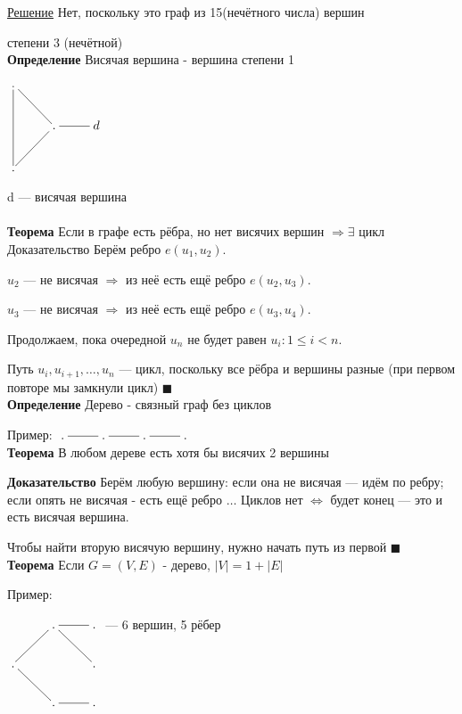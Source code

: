 \documentclass[a4paper, 12pt] {article}
\begin{document}
\underline{Решение} Нет, поскольку это граф из 15(нечётного числа) вершин 

степени 3 (нечётной)\\

\textbf{Определение}
Висячая вершина - вершина степени 1

$\xymatrix{
	. \ar@{-}[dd] \\
	& . \ar@{-}[ul] \ar@{-}[dl] & d \ar@{-}[l]\\
	.\\
}$ 

d --- висячая вершина\\ \\
\textbf{Теорема}
Если в графе есть рёбра, но нет висячих вершин $ \Rightarrow \exists $ цикл
Доказательство
Берём ребро $ e(u_{1}, u_{2}) $. 

$u_{2} $ --- не висячая $ \Rightarrow $ из неё есть ещё ребро $ e(u_{2}, u_{3})$.

$u_{3} $ --- не висячая $ \Rightarrow $ из неё есть ещё ребро $ e(u_{3}, u_{4})$.

Продолжаем, пока очередной $u_{n} $ не будет равен $u_{i}: 1 \le i < n $.

Путь $ u_{i}, u_{i+1}, \dots, u_{n} $ --- цикл, поскольку все рёбра и вершины разные (при первом повторе мы замкнули цикл) $ \blacksquare $\\

\textbf{Определение}
Дерево - связный граф без циклов

Пример:
$\xymatrix{
	. \ar@{-}[r] & . \ar@{-}[r] & . \ar@{-}[r] & . 
} $\\

\textbf{Теорема}
В любом дереве есть хотя бы висячих 2 вершины

\textbf{Доказательство}
Берём любую вершину: если она не висячая --- идём по ребру; если опять не висячая - есть ещё ребро $ \dots $ Циклов нет $ \Leftrightarrow $ будет конец --- это и есть висячая вершина.

Чтобы найти вторую висячую вершину, нужно начать путь из первой $ \blacksquare $\\

\textbf{Теорема}
Если $G = (V, E)$ - дерево, $ |V| = 1 + |E| $

Пример:

$\xymatrix{
	& . \ar@{-}[r] \ar@{-}[rd]. & .\\
	. \ar@{-}[ru] \ar@{-}[rd] & & .\\
	& . \ar@{-}[r] & . \\
}$ 
--- 6 вершин, 5 рёбер\\
\end{document}
